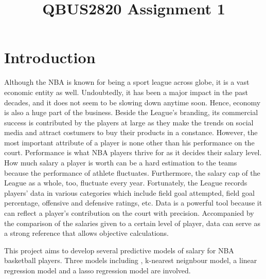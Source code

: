 \documentclass[letterpaper,12pt,twoside,]{pinp}
\title{QBUS2820 Assignment 1}
\author[]{}
\begin{document}
\verticaladjustment{-2pt}

\maketitle
\thispagestyle{firststyle}



\hypertarget{introduction}{%
\section{Introduction}\label{introduction}}

Although the NBA is known for being a sport league across globe, it is a
vast economic entity as well. Undoubtedly, it has been a major impact in
the past decades, and it does not seem to be slowing down anytime soon.
Hence, economy is also a huge part of the business. Beside the League's
branding, its commercial success is contributed by the players at large
as they make the trends on social media and attract costumers to buy
their products in a constance. However, the most important attribute of
a player is none other than his performance on the court. Performance is
what NBA players thrive for as it decides their salary level. How much
salary a player is worth can be a hard estimation to the teams because
the performance of athlete fluctuates. Furthermore, the salary cap of
the League as a whole, too, fluctuate every year. Fortunately, the
League records players' data in various categories which include field
goal attempted, field goal percentage, offensive and defensive ratings,
etc. Data is a powerful tool because it can reflect a player's
contribution on the court with precision. Accompanied by the comparison
of the salaries given to a certain level of player, data can serve as a
strong reference that allows objective calculations.

This project aims to develop several predictive models of salary for NBA
basketball players. Three models including , k-nearest neignbour model,
a linear regression model and a lasso regression model are involved.
\end{document}
